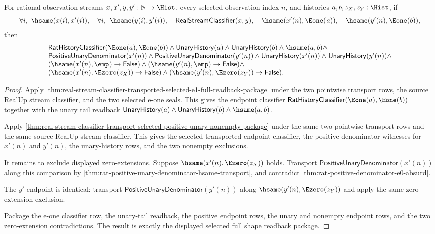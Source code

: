 \begin{theorem}
\label{thm:real-stream-classifier-transported-selected-full-shape-readback-package}
For rational-observation streams $x,x',y,y':\mathbb{N}\to\Hist$, every selected
observation index $n$, and histories $a,b,z_X,z_Y:\Hist$, if
$$
\forall i,\ \hsame(x(i),x'(i)),\quad
\forall i,\ \hsame(y(i),y'(i)),\quad
\mathsf{RealStreamClassifier}(x,y),\quad
\hsame(x'(n),\Eone(a)),\quad
\hsame(y'(n),\Eone(b)),
$$
then
$$
\begin{array}{l}
\mathsf{RatHistoryClassifier}(\Eone(a),\Eone(b))\land
\mathsf{UnaryHistory}(a)\land \mathsf{UnaryHistory}(b)\land \hsame(a,b)\land\\
\mathsf{PositiveUnaryDenominator}(x'(n))\land
\mathsf{PositiveUnaryDenominator}(y'(n))\land
\mathsf{UnaryHistory}(x'(n))\land
\mathsf{UnaryHistory}(y'(n))\land\\
(\hsame(x'(n),\emp)\to\mathsf{False})\land
(\hsame(y'(n),\emp)\to\mathsf{False})\land\\
(\hsame(x'(n),\Ezero(z_X))\to\mathsf{False})\land
(\hsame(y'(n),\Ezero(z_Y))\to\mathsf{False}).
\end{array}
$$
\end{theorem}
\begin{proof}
Apply
\autoref{thm:real-stream-classifier-transported-selected-e1-full-readback-package}
under the two pointwise transport rows, the source RealUp stream classifier, and
the two selected e-one seals. This gives the endpoint classifier
$\mathsf{RatHistoryClassifier}(\Eone(a),\Eone(b))$ together with the unary tail
readback
$\mathsf{UnaryHistory}(a)\land \mathsf{UnaryHistory}(b)\land \hsame(a,b)$.

Apply
\autoref{thm:real-stream-classifier-transport-selected-positive-unary-nonempty-package}
under the same two pointwise transport rows and the same source RealUp stream
classifier. This gives the selected transported endpoint classifier, the
positive-denominator witnesses for $x'(n)$ and $y'(n)$, the unary-history rows,
and the two nonempty exclusions.

It remains to exclude displayed zero-extensions. Suppose
$\hsame(x'(n),\Ezero(z_X))$ holds. Transport
$\mathsf{PositiveUnaryDenominator}(x'(n))$ along this comparison by
\autoref{thm:rat-positive-unary-denominator-hsame-transport}, and contradict
\autoref{thm:rat-positive-denominator-e0-absurd}.

The $y'$ endpoint is identical: transport
$\mathsf{PositiveUnaryDenominator}(y'(n))$ along
$\hsame(y'(n),\Ezero(z_Y))$ and apply the same zero-extension exclusion.

Package the e-one classifier row, the unary-tail readback, the positive endpoint
rows, the unary and nonempty endpoint rows, and the two zero-extension
contradictions. The result is exactly the displayed selected full shape readback
package.
\end{proof}

